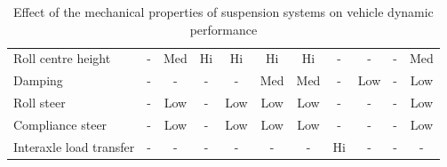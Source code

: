 \begin{table}[H]
\begin{threeparttable}
\begin{tabulary}{\textwidth}{lcccccccccc}
            Roll centre height & -     & Med   & Hi    & Hi    & Hi    & Hi    & -     & -     & -     & Med \\
            Damping & -     & -     & -     & -     & Med   & Med   & -     & Low   & -     & Low \\
            Roll steer & -     & Low   & -     & Low   & Low   & Low   & -     & -     & -     & Low \\
            Compliance steer & -     & Low   & -     & Low   & Low   & Low   & -     & -     & -     & Low \\
            Interaxle load transfer & -     & -     & -     & -     & -     & -     & Hi    & -     & -     & -\\
            \bottomrule
		\end{tabulary}

		\caption{Effect of the mechanical properties of suspension systems on vehicle dynamic performance}
		\label{table:effect-of-the-mechanical-properties-of-suspensions-on-vehicle-dynamic-performance}

	\end{threeparttable}
\end{table}


